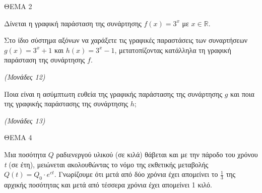 \documentclass[11pt,a4paper,twoside]{book}
\newcommand{\monades}[1]{\hfill \textit{(Μονάδες #1)}}
\begin{document}
\vspace{4mm}

ΘΕΜΑ 2

Δίνεται η γραφική παράσταση της συνάρτησης $f(x) = 3^x$ με $x \in \mathbb{R}$.


\begin{center}


\end{center}


\begin{alist}
\item Στο ίδιο σύστημα αξόνων να χαράξετε τις γραφικές παραστάσεις των συναρτήσεων $g(x) = 3^x + 1$ και $h(x) = 3^x - 1$, μετατοπίζοντας κατάλληλα τη γραφική παράσταση της συνάρτησης $f$.

\monades{12}

\item Ποια είναι η ασύμπτωτη ευθεία της γραφικής παράστασης της συνάρτησης $g$ και ποια της γραφικής παράστασης της συνάρτησης $h$;

\monades{13}
\end{alist}

\vspace{4mm}

ΘΕΜΑ 4

Μια ποσότητα $Q$ ραδιενεργού υλικού (σε κιλά) θάβεται και με την πάροδο του χρόνου \emph{t} (σε έτη), μειώνεται ακολουθώντας το νόμο της εκθετικής μεταβολής $Q(t) = Q_0 \cdot e^{ct}$. Γνωρίζουμε ότι μετά από δύο χρόνια έχει απομείνει το $\frac{1}{3}$ της αρχικής ποσότητας και μετά από τέσσερα χρόνια έχει απομείνει 1 κιλό.
\end{document}
